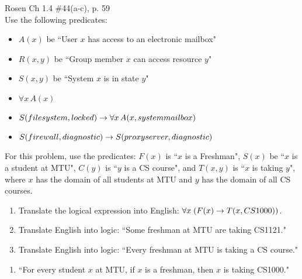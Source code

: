 \begin{questions}
 Rosen Ch 1.4 \#44(a-c), p. 59\\
Use the following predicates:
  \begin{itemize}[itemsep=0pt,parsep=0pt,topsep=0pt,partopsep=0pt]
    \item $A(x)$ be ``User $x$ has access to an electronic mailbox"
    \item $R(x,y)$ be ``Group member $x$ can access resource $y$"
    \item $S(x,y)$ be ``System $x$ is in state $y$"
  \end{itemize}
    \ifprintanswers
        \vspace{-12pt}
    \fi
  \begin{solution}
    \begin{itemize}[itemsep=0pt,parsep=0pt,topsep=0pt,partopsep=0pt]
      \item $\forall x\, A(x)$
      \item $S(file system, locked) \rightarrow  \forall x\, A(x, system mailbox)$
      \item $S(firewall, diagnostic) \rightarrow S(proxy server, diagnostic)$
    \end{itemize}
  \end{solution}



\label{proba} For this problem, use the predicates: $F(x)$ is ``$x$ is a Freshman", $S(x)$ be ``$x$ is a student at MTU", $C(y)$ is ``$y$ is a CS course", and $T(x,y)$ is ``$x$ is taking $y$", where $x$ has the domain of all students at MTU and $y$ has the domain of all CS courses.
\begin{enumerate}[label=(\alph*),itemsep=0pt,parsep=0pt,
  topsep=0pt,partopsep=0pt]
    \item Translate the logical expression into English: $\forall x\; (F(x) \rightarrow T(x,CS1000))$.
    \item Translate English into logic: ``Some freshman at MTU are taking CS1121."
    \item Translate English into logic: ``Every freshman at MTU is taking a CS course."
\end{enumerate}
    \ifprintanswers
        \vspace{-12pt}
    \fi
\begin{solution}
    \begin{enumerate}[label=(\alph*),itemsep=0pt,parsep=0pt,
      topsep=0pt,partopsep=0pt]
        \item ``For every student $x$ at MTU, if $x$ is a freshman, then $x$ is taking CS1000."


\end{enumerate}
\end{solution}
\end{questions}
